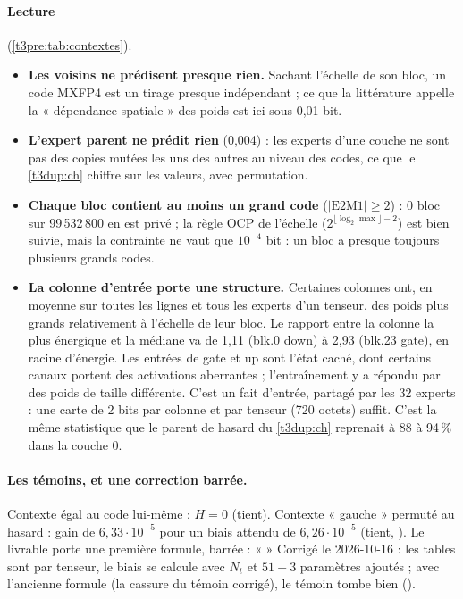 \paragraph{Lecture} (\cref{t3pre:tab:contextes}).
\begin{itemize}
\item \textbf{Les voisins ne prédisent presque rien.} Sachant l'échelle de son bloc, un code MXFP4 est un tirage presque indépendant ; ce que la littérature appelle la « dépendance spatiale » des poids est ici sous 0,01 bit.
\item \textbf{L'expert parent ne prédit rien} (0,004) : les experts d'une couche ne sont pas des copies mutées les uns des autres au niveau des codes, ce que le \cref{t3dup:ch} chiffre sur les valeurs, avec permutation.
\item \textbf{Chaque bloc contient au moins un grand code} ($|\mathrm{E2M1}| \ge 2$) : 0 bloc sur 99\,532\,800 en est privé ; la règle OCP de l'échelle ($2^{\lfloor\log_2 \max\rfloor - 2}$) est bien suivie, mais la contrainte ne vaut que $10^{-4}$ bit : un bloc a presque toujours plusieurs grands codes.
\item \textbf{La colonne d'entrée porte une structure.} Certaines colonnes ont, en moyenne sur toutes les lignes et tous les experts d'un tenseur, des poids plus grands relativement à l'échelle de leur bloc. Le rapport entre la colonne la plus énergique et la médiane va de 1,11 (blk.0 down) à 2,93 (blk.23 gate), en racine d'énergie. Les entrées de gate et up sont l'état caché, dont certains canaux portent des activations aberrantes ; l'entraînement y a répondu par des poids de taille différente. C'est un fait d'entrée, partagé par les 32 experts : une carte de 2 bits par colonne et par tenseur (720 octets) suffit. C'est la même statistique que le parent de hasard du \cref{t3dup:ch} reprenait à 88 à 94\,\% dans la couche 0.
\end{itemize}

\paragraph{Les témoins, et une correction barrée.} Contexte égal au code lui-même : $H = 0$ (tient). Contexte « gauche » permuté au hasard : gain de $6{,}33\cdot10^{-5}$ pour un biais attendu de $6{,}26\cdot10^{-5}$ (tient, ). Le livrable porte une première formule, barrée : «  » Corrigé le 2026-10-16 : les tables sont par tenseur, le biais se calcule avec $N_t$ et $51 - 3$ paramètres ajoutés ; avec l'ancienne formule (la cassure du témoin corrigé), le témoin tombe bien ().

